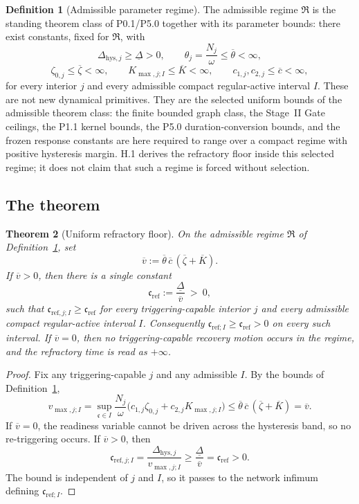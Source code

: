 \documentclass[11pt,a4paper]{article}
\newcommand{\cint}{\ensuremath{\mathfrak c}}
\theoremstyle{definition}
\newtheorem{definition}{Definition}[section]
\theoremstyle{plain}
\newtheorem{theorem}[definition]{Theorem}
\theoremstyle{remark}
\begin{document}
\begin{definition}[Admissible parameter regime]\label{def:regime}
The admissible regime \(\mathfrak R\) is the standing theorem class of P0.1/P5.0 together
with its parameter bounds: there exist constants, fixed for \(\mathfrak R\), with
\[
\Delta_{\mathrm{hys},j}\ge\underline{\Delta}>0,
\qquad
\theta_j=\frac{N_j}{\omega}\le\overline{\theta}<\infty,
\]
\[
\zeta_{0,j}\le\overline\zeta<\infty,
\qquad
K_{\max,j;I}\le\overline K<\infty,
\qquad
c_{1,j},c_{2,j}\le\overline c<\infty,
\]
for every interior \(j\) and every admissible compact regular-active interval \(I\). These
are not new dynamical primitives. They are the selected uniform bounds of the admissible
theorem class: the finite bounded graph class, the Stage~II Gate ceilings, the P1.1 kernel
bounds, the P5.0 duration-conversion bounds, and the frozen response constants are here
required to range over a compact regime with positive hysteresis margin. H.1 derives the
refractory floor inside this selected regime; it does not claim that such a regime is forced
without selection.
\end{definition}

\subsection{The theorem}

\begin{theorem}[Uniform refractory floor]\label{thm:unifloor}
On the admissible regime \(\mathfrak R\) of Definition~\ref{def:regime}, set
\[
\overline v
:=
\overline\theta\,\overline c\,(\overline\zeta+\overline K).
\]
If \(\overline v>0\), then there is a single constant
\[
\boxed{\;
\mathfrak c_{\mathrm{ref}}
:=
\frac{\underline\Delta}{\overline v}
\ >\ 0,
\;}
\]
such that \(\mathfrak c_{\mathrm{ref},j;I}\ge\mathfrak c_{\mathrm{ref}}\) for every
triggering-capable interior \(j\) and every admissible compact regular-active interval \(I\).
Consequently \(\mathfrak c_{\mathrm{ref};I}\ge\mathfrak c_{\mathrm{ref}}>0\) on every such
interval. If \(\overline v=0\), then no triggering-capable recovery motion occurs in the
regime, and the refractory time is read as \(+\infty\).
\end{theorem}

\begin{proof}
Fix any triggering-capable \(j\) and any admissible \(I\). By the bounds of
Definition~\ref{def:regime},
\[
v_{\max,j;I}
=
\sup_{\cint\in I}\frac{N_j}{\omega}\bigl(c_{1,j}\zeta_{0,j}+c_{2,j}K_{\max,j;I}\bigr)
\le
\overline\theta\,\overline c\,(\overline\zeta+\overline K)
=
\overline v.
\]
If \(\overline v=0\), the readiness variable cannot be driven across the hysteresis band, so
no re-triggering occurs. If \(\overline v>0\), then
\[
\mathfrak c_{\mathrm{ref},j;I}
=
\frac{\Delta_{\mathrm{hys},j}}{v_{\max,j;I}}
\ge
\frac{\underline\Delta}{\overline v}
=
\mathfrak c_{\mathrm{ref}}>0.
\]
The bound is independent of \(j\) and \(I\), so it passes to the network infimum defining
\(\mathfrak c_{\mathrm{ref};I}\). \qedhere
\end{proof}
\end{document}
